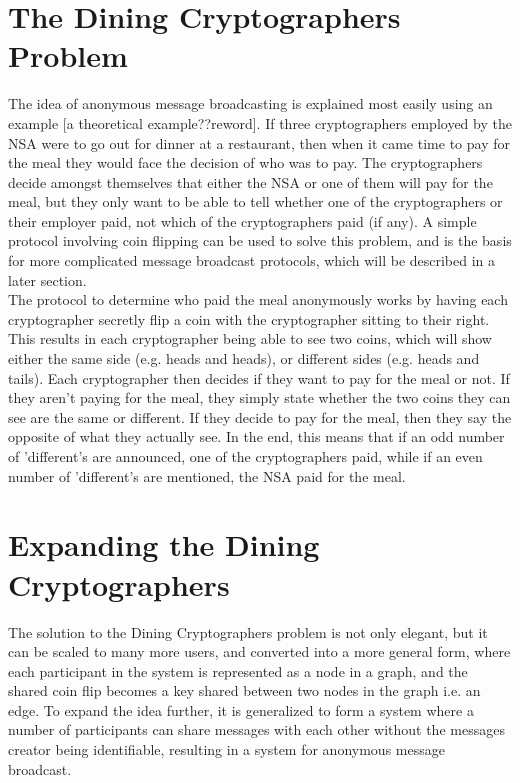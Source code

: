 \section{The Dining Cryptographers Problem}

The idea of anonymous message broadcasting is explained most easily using an
example [a theoretical example??reword].  If three cryptographers employed by
the NSA were to go out for dinner at a restaurant, then when it came time to
pay for the meal they would face the decision of who was to pay.  The
cryptographers decide amongst themselves that either the NSA or one of them
will pay for the meal, but they only want to be able to tell whether one of the
cryptographers or their employer paid, not which of the cryptographers paid (if
any).  A simple protocol involving coin flipping can be used to solve this
problem, and is the basis for more complicated message broadcast protocols,
which will be described in a later section. \\

The protocol to determine who paid the meal anonymously works by having each
cryptographer secretly flip a coin with the cryptographer sitting to their right.  This
results in each cryptographer being able to see two coins, which will show
either the same side (e.g. heads and heads), or different sides (e.g. heads and
tails).  Each cryptographer then decides if they want to pay for the meal or
not.  If they aren't paying for the meal, they simply state whether the two
coins they can see are the same or different.  If they decide to pay for the
meal, then they say the opposite of what they actually see.  In the end, this
means that if an odd number of 'different's are announced, one of the
cryptographers paid, while if an even number of 'different's are mentioned, the
NSA paid for the meal. \\

\section{Expanding the Dining Cryptographers}

The solution to the Dining Cryptographers problem is not only elegant, but it
can be scaled to many more users, and converted into a more general form, where
each participant in the system is represented as a node in a graph, and the
shared coin flip becomes a key shared between two nodes in the graph i.e. an
edge.  To expand the idea further, it is generalized to form a system where a
number of participants can share messages with each other without the messages
creator being identifiable, resulting in a system for anonymous message
broadcast. \\

